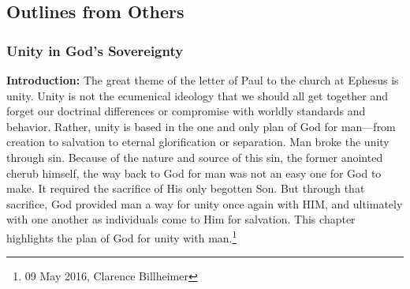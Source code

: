 \subsection{Outlines from Others}


\subsubsection{Unity in God's Sovereignty}
\textbf{Introduction:} The great theme of the letter of Paul to the church at Ephesus is unity. Unity is not the ecumenical ideology that we should all get together and forget our doctrinal differences or compromise with worldly standards and behavior. Rather, unity is based in the one and only plan of God for man—from creation to salvation to eternal glorification or separation. Man broke the unity through sin. Because of the nature and source of this sin, the former anointed cherub himself, the way back to God for man was not an easy one for God to make. It required the sacrifice of His only begotten Son. But through that sacrifice, God provided man a way for unity once again with HIM, and ultimately with one another as individuals come to Him for salvation. This chapter highlights the plan of God for unity with man.\footnote{09 May 2016, Clarence Billheimer}
